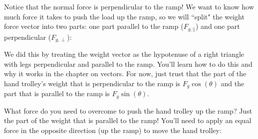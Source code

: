 Notice that the normal force is perpendicular to the ramp! We want to know how 
much force it takes to push the load up the ramp, so we will ``split" the 
weight force vector into two parts: one part parallel to the ramp ($F_{g,\vert 
\vert}$) and one part perpendicular ($F_{g, \perp}$):

\begin{center}
\end{center}

We did this by treating the weight vector as the hypotenuse of a right triangle 
with legs perpendicular and parallel to the ramp. You'll learn how to do this 
and why it works in the chapter on vectors. For now, just trust that the part 
of the hand trolley's weight that is perpendicular to the ramp is $F_g \cos{ 
\left( \theta \right) }$ and the part that is parallel to the ramp is $F_g 
\sin{ \left( \theta \right) }$.

What force do you need to overcome to push the hand trolley up the ramp? Just 
the part of the weight that is parallel to the ramp! You'll need to apply an 
equal force in the opposite direction (up the ramp) to move the hand trolley:

